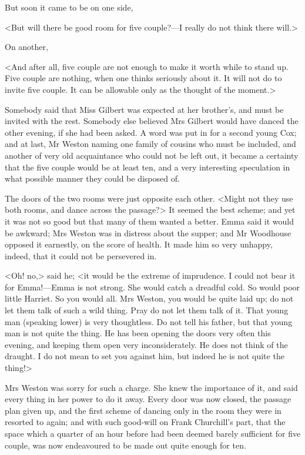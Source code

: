But soon it came to be on one side,

<But will there be good room for five couple?—I really do not think there will.>

On another,

<And after all, five couple are not enough to make it worth while to stand up. Five couple are nothing, when one thinks seriously about it. It will not do to invite five couple. It can be allowable only as the thought of the moment.>

Somebody said that Miss Gilbert was expected at her brother's, and must be invited with the rest. Somebody else believed Mrs Gilbert would have danced the other evening, if she had been asked. A word was put in for a second young Cox; and at last, Mr Weston naming one family of cousins who must be included, and another of very old acquaintance who could not be left out, it became a certainty that the five couple would be at least ten, and a very interesting speculation in what possible manner they could be disposed of.

The doors of the two rooms were just opposite each other. <Might not they use both rooms, and dance across the passage?> It seemed the best scheme; and yet it was not so good but that many of them wanted a better. Emma said it would be awkward; Mrs Weston was in distress about the supper; and Mr Woodhouse opposed it earnestly, on the score of health. It made him so very unhappy, indeed, that it could not be persevered in.

<Oh! no,> said he; <it would be the extreme of imprudence. I could not bear it for Emma!—Emma is not strong. She would catch a dreadful cold. So would poor little Harriet. So you would all. Mrs Weston, you would be quite laid up; do not let them talk of such a wild thing. Pray do not let them talk of it. That young man (speaking lower) is very thoughtless. Do not tell his father, but that young man is not quite the thing. He has been opening the doors very often this evening, and keeping them open very inconsiderately. He does not think of the draught. I do not mean to set you against him, but indeed he is not quite the thing!>

Mrs Weston was sorry for such a charge. She knew the importance of it, and said every thing in her power to do it away. Every door was now closed, the passage plan given up, and the first scheme of dancing only in the room they were in resorted to again; and with such good-will on Frank Churchill's part, that the space which a quarter of an hour before had been deemed barely sufficient for five couple, was now endeavoured to be made out quite enough for ten.

